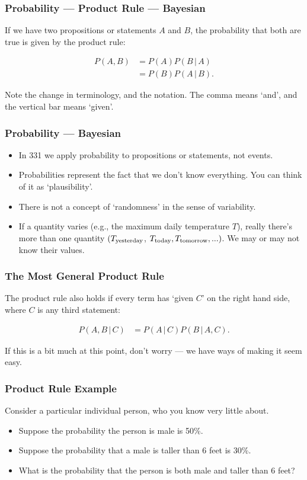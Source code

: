 \documentclass{beamer}
\newcommand{\given}{\,|\,}
\begin{document}
\begin{frame}
\frametitle{Probability --- Product Rule --- Bayesian}
If we have two {\color{blue} propositions} or
{\color{blue} statements}
 $A$ and $B$, the probability that both {\color{blue} are true}
is given by the product rule:

\begin{align}
P(A, B) &= P(A)P(B \given A) \\
        &= P(B)P(A \given B).
\end{align}\pause

Note the change in terminology, and the notation. The comma means `and',
and the vertical bar means `given'.



\end{frame}


\begin{frame}
\frametitle{Probability --- Bayesian}
\begin{itemize}
\item In 331 we apply probability to {\color{blue} propositions
or statements}, not events. \pause
\item Probabilities represent the fact that we don't know everything.
You can think of it as `plausibility'. \pause
\item There is not a concept of `randomness' in the
sense of variability.\pause
\item If a quantity varies (e.g., the maximum daily temperature $T$),
really there’s more than one quantity
$(T_{\rm yesterday}$, $T_{\rm today}, T_{\rm tomorrow}, ...)$. We may or may
not know their values.
\end{itemize}

\end{frame}

\begin{frame}
\frametitle{The Most General Product Rule}
The product rule also holds if every term has `given $C$' on the right hand
side, where $C$ is any third statement:

\begin{align}
P(A, B \given C) &= P(A \given C)P(B \given A, C).
\end{align}\pause

If this is a bit much at this point, don't worry --- we have ways of making it
seem easy.

\end{frame}


\begin{frame}
\frametitle{Product Rule Example}
Consider a particular individual person, who you know very little about.

\begin{itemize}
\item Suppose the probability the person is male is 50\%.
\item Suppose the probability that a male is taller than 6 feet is
30\%.
\item What is the probability that the person is both male and
taller than 6 feet?
\end{itemize}

\end{frame}
\end{document}
